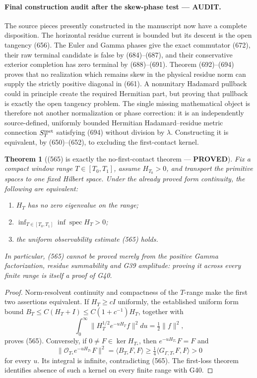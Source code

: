 \documentclass[11pt]{article}
\newtheorem{theorem}{Theorem}
\newcommand{\PROVED}{\textcolor{green!45!black}{\textbf{PROVED}}}
\newcommand{\AUDIT}{\textcolor{orange!75!black}{\textbf{AUDIT}}}
\begin{document}
\paragraph{Final construction audit after the skew-phase test ---
\AUDIT.}
The source pieces presently constructed in the manuscript now have a
complete disposition.  The horizontal residue current is bounded but its
descent is the open tangency (656).  The Euler and Gamma phases give the
exact commutator (672), their raw terminal candidate is false by
(684)--(687), and their conservative exterior completion has zero terminal
by (688)--(691).  Theorem (692)--(694) proves that no realization which
remains skew in the physical residue norm can supply the strictly positive
diagonal in (661).  A nonunitary Hadamard pullback could in principle create
the required Hermitian part, but proving that pullback is exactly the open
tangency problem.  The single
missing mathematical object is therefore not another normalization or
phase correction: it is an independently source-defined, uniformly bounded
Hermitian Hadamard--residue metric connection \(S_T^{\rm met}\) satisfying
(694) without division by \(\lambda\).  Constructing it is equivalent, by
(650)--(652), to excluding the first-contact kernel.

\begin{theorem}[(565) is exactly the no-first-contact theorem ---
\PROVED]
Fix a compact window range \(T\in[T_0,T_1]\), assume \(H_{T_0}>0\), and
transport the primitive spaces to one fixed Hilbert space.  Under the
already proved form continuity, the following are equivalent:
\begin{enumerate}
\item \(H_T\) has no zero eigenvalue on the range;
\item \(\inf_{T\in[T_0,T_1]}\inf\operatorname{spec}H_T>0\);
\item the uniform observability estimate (565) holds.
\end{enumerate}
In particular, (565) cannot be proved merely from the positive Gamma
factorization, residue summability and G39 amplitude: proving it across
every finite range is itself a proof of G40.
\end{theorem}

\begin{proof}
Norm-resolvent continuity and compactness of the \(T\)-range make the first
two assertions equivalent.  If \(H_T\ge cI\) uniformly, the established
uniform form bound \(B_T\le C(H_T+I)\le C(1+c^{-1})H_T\), together with
\[
 \int_0^\infty
 \|H_T^{1/2}e^{-uH_T}f\|^2du
 =\tfrac12\|f\|^2,
\]
proves (565).  Conversely, if \(0\ne F\in\ker H_{T_*}\), then
\(e^{-uH_{T_*}}F=F\) and
\[
 \|\mathcal O_{T_*}e^{-uH_{T_*}}F\|^2
 =\langle B_{T_*}F,F\rangle
 \ge\tfrac14\langle G_{\Gamma,T_*}F,F\rangle>0
\]
for every \(u\).  Its integral is infinite, contradicting (565).  The
first-loss theorem identifies absence of such a kernel on every finite
range with G40.
\end{proof}
\end{document}

